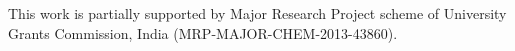 \documentclass[aps,pre,reprint,groupedaddress]{revtex4-1}
\begin{document}


\begin{acknowledgments}
This work is partially supported by Major Research Project scheme of University Grants Commission, India (MRP-MAJOR-CHEM-2013-43860).
\end{acknowledgments}

%
\end{document}
